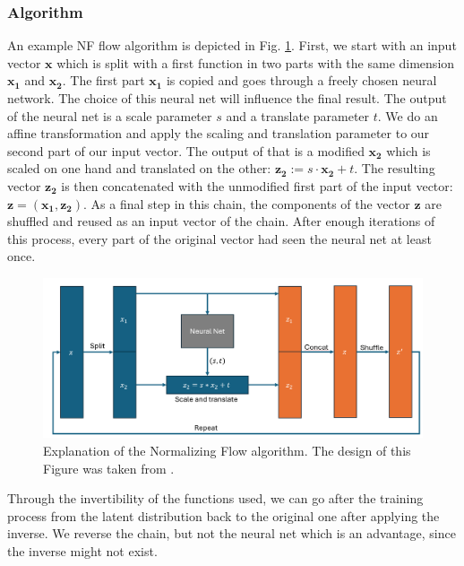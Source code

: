 \documentclass[
nofootinbib,
 amsmath,amssymb,
 aps,
]{revtex4-2}
\begin{document}
\subsubsection{Algorithm}

An example NF flow algorithm is depicted in Fig. \ref{fig:NF_Explained}. First, we start with an input vector $\boldsymbol{x}$ which is split with a first function in two parts with the same dimension $\boldsymbol{x_1}$ and $\boldsymbol{x_2}$. The first part $\boldsymbol{x_1}$ is copied and goes through a freely chosen neural network. The choice of this neural net will influence the final result. The output of the neural net is a scale parameter $s$ and a translate parameter $t$. We do an affine transformation and apply the scaling and translation parameter to our second part of our input vector. The output of that is a modified $\boldsymbol{x_2}$ which is scaled on one hand and translated on the other: $\boldsymbol{z_2} := s \cdot \boldsymbol{x_2} + t$. The resulting vector $\boldsymbol{z_2}$ is then concatenated with the unmodified first part of the input vector: $\boldsymbol{z} = (\boldsymbol{x_1}, \boldsymbol{z_2})$. As a final step in this chain, the components of the vector $\boldsymbol{z}$ are shuffled and reused as an input vector of the chain. After enough iterations of this process, every part of the original vector had seen the neural net at least once. \\

\begin{figure}[h!]
\includegraphics[scale=0.60]{Plots/NF_Explained.png}
\caption{\label{fig:NF_Explained} Explanation of the Normalizing Flow algorithm. The design of this Figure was taken from \cite{NF_YT}.}
\end{figure}

Through the invertibility of the functions used, we can go after the training process from the latent distribution back to the original one after applying the inverse. We reverse the chain, but not the neural net which is an advantage, since the inverse might not exist. 
\end{document}
